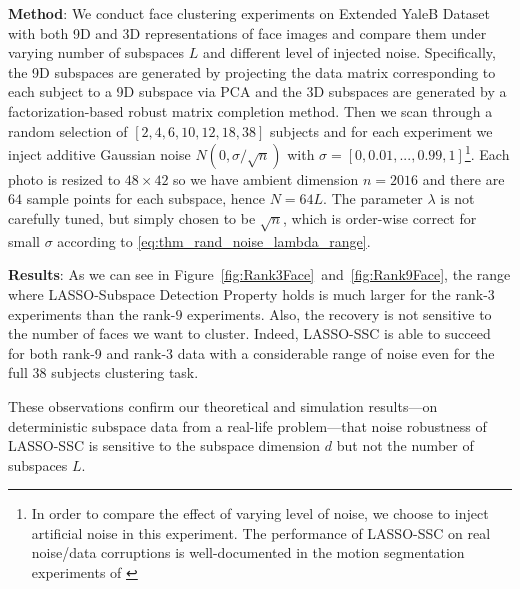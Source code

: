 \documentclass[twoside,11pt]{article}
\numberwithin{equation}{section}
\begin{document}
\textbf{Method}:  We conduct face clustering experiments on Extended YaleB Dataset with both 9D and 3D representations of face images and compare them under varying number of subspaces $L$ and different level of injected noise. Specifically, the 9D subspaces are generated by projecting the data matrix corresponding to each subject to a 9D subspace via PCA and the 3D subspaces are generated by a factorization-based robust matrix completion method. Then we scan through a random selection of $[2,4,6,10,12,18,38]$ subjects and for each experiment we inject additive Gaussian noise $N(0,\sigma/\sqrt{n})$ with $\sigma=[0,0.01,...,0.99,1]$\footnote{In order to compare the effect of varying level of noise, we choose to inject artificial noise in this experiment. The performance of LASSO-SSC on real noise/data corruptions is well-documented in the motion segmentation experiments of \citet{elhamifar2009ssc,elhamifar2012ssc_journal}}. Each photo is resized to $48\times 42$ so we have ambient dimension $n=2016$ and there are $64$ sample points for each subspace, hence $N=64L$. The parameter $\lambda$ is not carefully tuned, but simply chosen to be $\sqrt{n}$, which is order-wise correct for small $\sigma$ according to \eqref{eq:thm_rand_noise_lambda_range}. %


\textbf{Results}:
As we can see in Figure~\ref{fig:Rank3Face}~and~\ref{fig:Rank9Face}, the range where LASSO-Subspace Detection Property holds is much larger for the rank-$3$ experiments than the rank-$9$ experiments. Also, the recovery is not sensitive to the number of faces we want to cluster. Indeed, LASSO-SSC is able to succeed for both rank-9 and rank-3 data with a considerable range of noise even for the full 38 subjects clustering task.

These observations confirm our theoretical and simulation results---on deterministic subspace data from a real-life problem---that noise robustness of LASSO-SSC is sensitive to the subspace dimension $d$ but  not the number of subspaces $L$.

\end{document}
